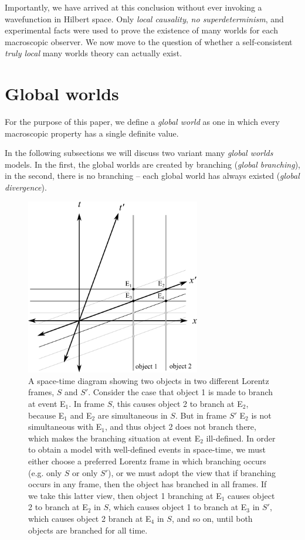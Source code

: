 \documentclass[a4paper]{article}
\begin{document}
Importantly, we have arrived at this conclusion without ever invoking a wavefunction in Hilbert space.  Only \textit{local causality}, \textit{no superdeterminism}, and experimental facts were used to prove the existence of many worlds for each macroscopic observer.  We now move to the question of whether a self-consistent \textit{truly local} many worlds theory can actually exist.

\section{Global worlds} \label{Global}

For the purpose of this paper, we define a \textit{global world} as one in which every macroscopic property has a single definite value.

In the following subsections we will discuss two variant many \textit{global worlds} models. In the first, the global worlds are created by branching (\textit{global branching}), in the second, there is no branching -- each global world has always existed (\textit{global divergence}).

\begin{figure}[t]
    \centering
    \includegraphics[width=3in]{Branching.pdf}
    \caption{A space-time diagram showing two objects in two different Lorentz frames, $S$ and $S'$.  Consider the case that object 1 is made to branch at event E$_1$.  In frame $S$, this causes object 2 to branch at E$_2$, because E$_1$ and E$_2$ are simultaneous in $S$. But in frame $S'$ E$_2$ is not simultaneous with E$_1$, and thus object 2 does not branch there, which makes the branching situation at event E$_2$ ill-defined. In order to obtain a model with well-defined events in space-time, we must either choose a preferred Lorentz frame in which branching occurs (e.g. only $S$ or only $S'$), or we must adopt the view that if branching occurs in any frame, then the object has branched in all frames.  If we take this latter view, then object 1 branching at E$_1$ causes object 2 to branch at E$_2$ in $S$, which causes object 1 to branch at E$_3$ in $S'$, which causes object 2 branch at E$_4$ in $S$, and so on, until both objects are branched for all time.}
    \label{fig:branching}
\end{figure}
\end{document}
